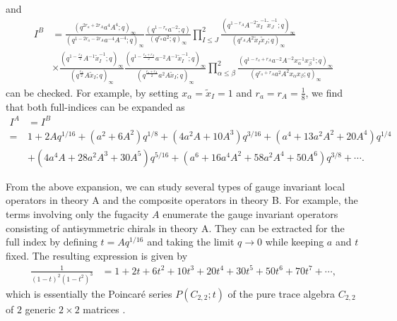 \documentclass[12pt]{article}
\DeclareMathOperator*{\Tr}{{\rm Tr}}
\numberwithin{equation}{section}
\begin{document}
and 
\begin{align}
I^B&=
\frac{(q^{2r_a+2r_A}a^4 A^4;q)_{\infty}}
{(q^{1-2r_a-2r_A}a^{-4}A^{-4};q)_{\infty}}
%
\frac{(q^{1-r_a}a^{-2};q)}{(q^{r_a}a^2;q)_{\infty}}
%
\prod_{I\le J}^{2}
\frac{(q^{1-r_A}A^{-2}\tilde{x}_I^{-1} \tilde{x}_J^{-1};q)_{\infty}}
{(q^{r_A}A^2\tilde{x}_I \tilde{x}_J;q)_{\infty}}
\nonumber\\
&\times 
\frac{
(q^{1-\frac{r_A}{2}}A^{-1}\tilde{x}_{I}^{-1};q)_{\infty}
}
{
(q^{\frac{r_A}{2}}A\tilde{x}_{I};q)_{\infty}
}
%
\frac{
(q^{1-\frac{r_a+r_A}{2}}a^{-2}A^{-1}\tilde{x}_{I}^{-1};q)_{\infty}
}
{
(q^{\frac{r_a+r_A}{2}}a^2A\tilde{x}_{I};q)_{\infty}
}
\prod_{\alpha\le \beta}^2
\frac{
(q^{1-r_a+r_A}a^{-2}A^{-2}x_{\alpha}^{-1}x_{\beta}^{-1};q)_{\infty}
}
{
(q^{r_a+r_A}a^2A^2 x_{\alpha}x_{\beta};q)_{\infty}
}
\end{align}
can be checked. 
For example, by setting $x_{\alpha}=\tilde{x}_{I}=1$ and $r_a=r_A=\frac18$, 
we find that both full-indices can be expanded as
\begin{align}
I^A&=I^B
\nonumber\\
 = & 1 + 2Aq^{1/16} + (a^2 + 6A^2)q^{1/8} + (4a^2A + 10A^3)q^{3/16} 
 + (a^4 + 13a^2A^2 + 20A^4)q^{1/4}
\nonumber\\
&+(4a^4A+28a^2A^3+30A^5)q^{5/16}+
(a^6+16a^4A^2+58a^2A^4+50A^6)q^{3/8}+\cdots. 
\end{align}

From the above expansion, we can study several types of  gauge invariant local operators in theory A and the composite operators in theory B. 
For example, the terms involving only the fugacity $A$ enumerate the gauge invariant operators consisting of antisymmetric chirals in theory A. They can be extracted for the full index by defining $t = Aq^{1/16}$ and taking the limit $q \rightarrow 0$ while keeping $a$ and $t$ fixed. The resulting expression is given by 
\begin{align}
\frac{1}{(1-t)^2(1-t^2)^3}
&=1+2t+6t^2+10t^3+20t^4 + 30t^5 + 50t^6+70t^7+\cdots, 
\end{align}
which is essentially the Poincar\'{e} series $P(C_{2,2};t)$ of the pure trace algebra $C_{2,2}$  of $2$ generic $2\times 2$ matrices \cite{MR2303199}.
\end{document}
